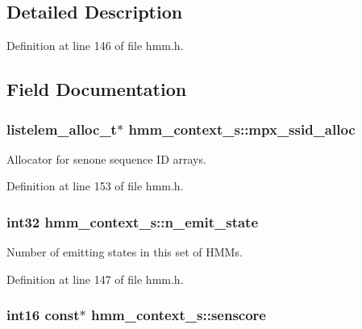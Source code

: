 \subsection{Detailed Description}


Definition at line 146 of file hmm.\-h.



\subsection{Field Documentation}
\subsubsection[{mpx\-\_\-ssid\-\_\-alloc}]{\setlength{\rightskip}{0pt plus 5cm}listelem\-\_\-alloc\-\_\-t$\ast$ hmm\-\_\-context\-\_\-s\-::mpx\-\_\-ssid\-\_\-alloc}\label{structhmm__context__s_a63486d186a984a87d060064e65fab564}


Allocator for senone sequence I\-D arrays. 



Definition at line 153 of file hmm.\-h.

\subsubsection[{n\-\_\-emit\-\_\-state}]{\setlength{\rightskip}{0pt plus 5cm}int32 hmm\-\_\-context\-\_\-s\-::n\-\_\-emit\-\_\-state}\label{structhmm__context__s_a27ba4c5db11110bddf240dd52ed36084}


Number of emitting states in this set of H\-M\-Ms. 



Definition at line 147 of file hmm.\-h.

\subsubsection[{senscore}]{\setlength{\rightskip}{0pt plus 5cm}int16 const$\ast$ hmm\-\_\-context\-\_\-s\-::senscore}\label{structhmm__context__s_a1cca9eb94bc20d9c5e60f2da18074397}


